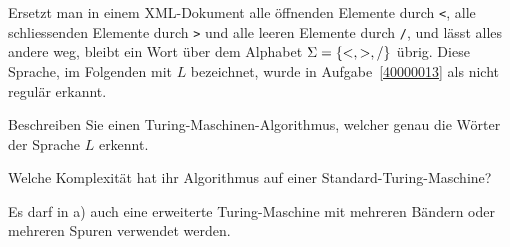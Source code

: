 Ersetzt man in einem XML-Dokument alle öffnenden Elemente durch {\tt <},
alle schliessenden Elemente durch {\tt >} und alle leeren Elemente
durch {\tt /}, und lässt alles andere weg, bleibt ein Wort über
dem Alphabet $\Sigma =\{{\tt <},{\tt >},{\tt /}\}$ übrig.
Diese Sprache, im Folgenden mit $L$ bezeichnet, wurde in Aufgabe~\ref{40000013}
als nicht regulär erkannt.
\begin{teilaufgaben}
\item
Beschreiben Sie einen Turing-Maschinen-Algorithmus, welcher genau die
Wörter der Sprache $L$ erkennt.
\item
Welche Komplexität hat ihr Algorithmus auf einer Standard-Turing-Maschine?
\end{teilaufgaben}

\begin{hinweis}
Es darf in a) auch eine erweiterte Turing-Maschine
mit mehreren Bändern oder mehreren Spuren verwendet werden.
\end{hinweis}

